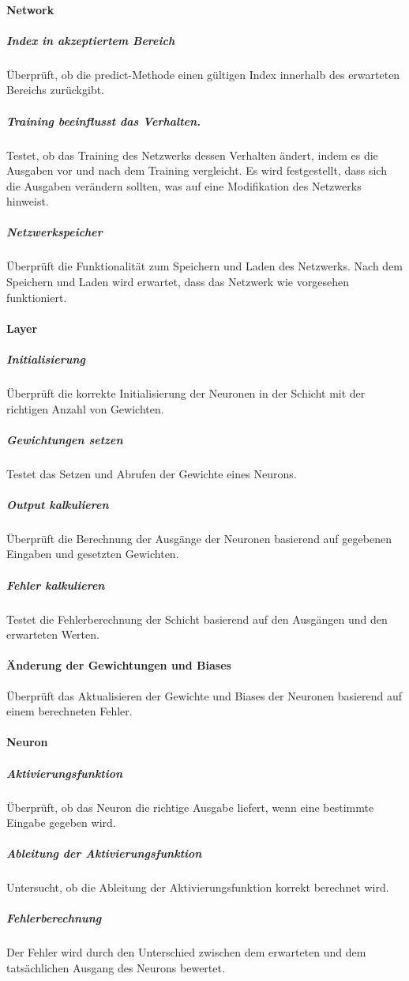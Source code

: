 \paragraph{Network}
\label{sec:DesignNetwork}
\subparagraph{Index in akzeptiertem Bereich}
\label{sec:DesignIndexInAkzeptiertemBereich}
Überprüft, ob die predict-Methode einen gültigen Index innerhalb des erwarteten Bereichs zurückgibt. 
\subparagraph{Training beeinflusst das Verhalten.}
\label{sec:DesignTrainingBeeinflusstDasVerhalten}
Testet, ob das Training des Netzwerks dessen Verhalten ändert, indem es die Ausgaben vor und nach dem Training vergleicht. Es wird festgestellt, dass sich die Ausgaben verändern sollten, was auf eine Modifikation des Netzwerks hinweist.
\subparagraph{Netzwerkspeicher}
\label{sec:DesignNetzwerkspeicher}
Überprüft die Funktionalität zum Speichern und Laden des Netzwerks. Nach dem Speichern und Laden wird erwartet, dass das Netzwerk wie vorgesehen funktioniert.

\paragraph{Layer}
\label{sec:DesignLayer}
\subparagraph{Initialisierung}
\label{sec:DesignInitialisierung}
Überprüft die korrekte Initialisierung der Neuronen in der Schicht mit der richtigen Anzahl von Gewichten. 
\subparagraph{Gewichtungen setzen}
\label{sec:DesignGewichtungenSetzen}
Testet das Setzen und Abrufen der Gewichte eines Neurons. 
\subparagraph{Output kalkulieren}
\label{sec:DesignOutputKalkulieren}
Überprüft die Berechnung der Ausgänge der Neuronen basierend auf gegebenen Eingaben und gesetzten Gewichten.
\subparagraph{Fehler kalkulieren}
\label{sec:DesignFehlerKalkulieren}
Testet die Fehlerberechnung der Schicht basierend auf den Ausgängen und den erwarteten Werten. 
\paragraph{Änderung der Gewichtungen und Biases}
\label{sec:DesignÄnderungDerGewichtungenUndBiases}
Überprüft das Aktualisieren der Gewichte und Biases der Neuronen basierend auf einem berechneten Fehler. 

\paragraph{Neuron}
\label{sec:DesignNeuron}
\subparagraph{Aktivierungsfunktion}
\label{sec:DesignAktivierungsfunktion}
Überprüft, ob das Neuron die richtige Ausgabe liefert, wenn eine bestimmte Eingabe gegeben wird. 
\subparagraph{Ableitung der Aktivierungsfunktion}
\label{sec:DesignAbleitungDerAktivierungsfunktion}
Untersucht, ob die Ableitung der Aktivierungsfunktion korrekt berechnet wird. 
\subparagraph{Fehlerberechnung  }
\label{sec:DesignFehlerberechnung}
Der Fehler wird durch den Unterschied zwischen dem erwarteten und dem tatsächlichen Ausgang des Neurons bewertet.